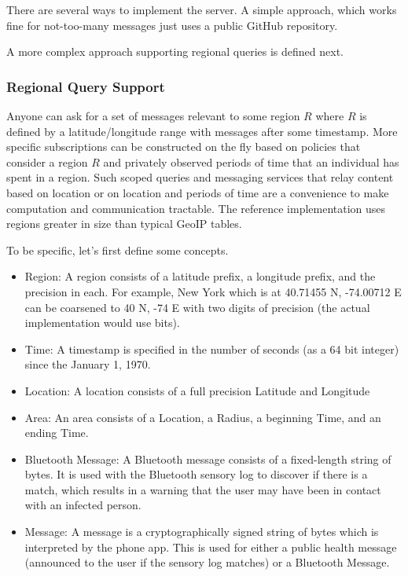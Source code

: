 \documentclass{article}
\begin{document}
There are several ways to implement the server.  A simple approach, which works fine for not-too-many messages just uses a public GitHub repository.

A more complex approach supporting regional queries is defined next.  

\subsubsection{Regional Query Support}
Anyone can ask for a set of messages relevant to some region $R$ where $R$ is defined by a latitude/longitude range with messages after some timestamp.  More specific subscriptions can be constructed on the fly based on policies that consider a region $R$ and privately observed periods of time that an individual has spent in a region. Such scoped queries and messaging services that relay content based on location or on location and periods of time are a convenience to make computation and communication tractable.  The reference implementation uses regions greater in size than typical GeoIP tables.

To be specific, let's first define some concepts.
\begin{itemize}
    \item Region: A region consists of a latitude prefix, a longitude prefix, and the precision in each.  For example, New York which is at 40.71455 N, -74.00712 E can be coarsened to 40 N, -74 E with two digits of precision (the actual implementation would use bits).
    \item Time: A timestamp is specified in the number of seconds (as a 64 bit integer) since the January 1, 1970. 
    \item Location: A location consists of a full precision Latitude and Longitude
    \item Area: An area consists of a Location, a Radius, a beginning Time, and an ending Time.
    \item Bluetooth Message: A Bluetooth message consists of a fixed-length string of bytes.  It is used with the Bluetooth sensory log to discover if there is a match, which results in a warning that the user may have been in contact with an infected person.  
    \item Message: A message is a cryptographically signed string of bytes which is interpreted by the phone app. This is used for either a public health message (announced to the user if the sensory log matches) or a Bluetooth Message. 
\end{itemize}
\end{document}
